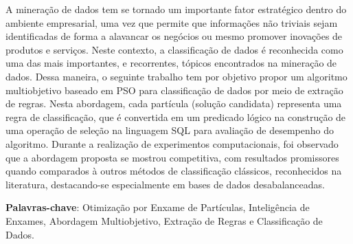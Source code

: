 \begin{resumo}
A mineração de dados tem se tornado um importante fator estratégico dentro do ambiente empresarial, uma vez que permite que informações não triviais sejam identificadas de forma a alavancar os negócios ou mesmo promover inovações de produtos e serviços. Neste contexto, a classificação de dados é reconhecida como uma das mais importantes, e recorrentes, tópicos encontrados na mineração de dados. Dessa maneira, o seguinte trabalho tem por objetivo propor um algoritmo multiobjetivo baseado em PSO para classificação de dados por meio de extração de regras. Nesta abordagem, cada partícula (solução candidata) representa uma regra de classificação, que é convertida em um predicado lógico na construção de uma operação de seleção na linguagem SQL para avaliação de desempenho do algoritmo. Durante a realização de experimentos computacionais, foi observado que a abordagem proposta se mostrou competitiva, com resultados promissores quando comparados à outros métodos de classificação clássicos, reconhecidos na literatura, destacando-se especialmente em bases de dados desabalanceadas. 

\vspace{1.5ex}

\noindent \textbf{Palavras-chave}: Otimização por Enxame de Partículas, Inteligência de Enxames, Abordagem Multiobjetivo, Extração de Regras e Classificação de Dados. 
\end{resumo}
